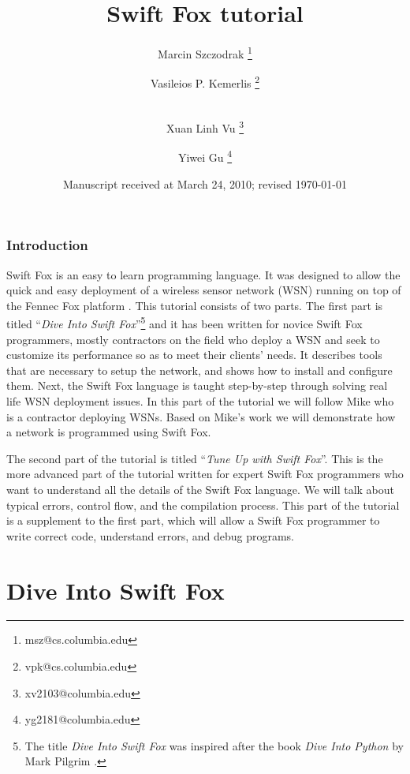 \documentclass[11pt]{article}
\begin{document}
\title{Swift Fox tutorial}
\author{Marcin Szczodrak \footnote{msz@cs.columbia.edu}}
\author{Vasileios P. Kemerlis \footnote{vpk@cs.columbia.edu}} 
\author{\\ Xuan Linh Vu \footnote{xv2103@columbia.edu}}
\author{Yiwei Gu \footnote{yg2181@columbia.edu}}
\date{Manuscript received at March 24, 2010; revised \today}
\maketitle


\section{Introduction}
\label{sec:introduction}

Swift Fox is an easy to learn programming language. It was designed to
allow the quick and easy deployment of a wireless sensor network (WSN)
running on top of the Fennec Fox platform \cite{marcin:whitepaper}. This
tutorial consists of two parts. The first part is titled ``\textit{Dive
Into Swift Fox}''\footnote{The title \textit{Dive Into Swift Fox} was 
inspired after the book \textit{Dive Into Python} by Mark Pilgrim
\cite{pilgrim:2004}.} and it has been written for novice Swift Fox
programmers, mostly contractors on the field who deploy a WSN and seek to 
customize its performance so as to meet their clients' needs. It describes
tools that are necessary to setup the network, and shows how to install
and configure them. Next, the Swift Fox language is taught step-by-step
through solving real life WSN deployment issues. In this part of the
tutorial we will follow Mike who is a contractor deploying WSNs. Based on
Mike's work we will demonstrate how a network is programmed using Swift
Fox.

The second part of the tutorial is titled ``\textit{Tune Up with Swift
Fox}''. This is the more advanced part of the tutorial written for expert
Swift Fox programmers who want to understand all the details of the
Swift Fox language. We will talk about typical errors, control flow, and
the compilation process. This part of the tutorial is a supplement to the
first part, which will allow a Swift Fox programmer to write correct code, 
understand errors, and debug programs.

\newpage
\part{Dive Into Swift Fox}
\newpage
\end{document}
